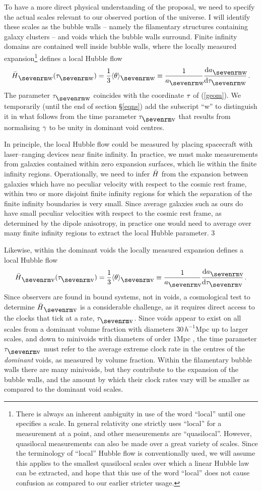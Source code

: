 \documentclass[12pt]{article}
\begin{document}
To have a more direct physical understanding of the proposal, we need to
specify the actual scales relevant to our observed portion of the universe.
I will identify these scales as the bubble walls -- namely the filamentary
structures containing galaxy clusters -- and voids which the bubble
walls surround. Finite infinity domains are contained well inside bubble
walls, where the locally measured expansion\footnote{There is always
an inherent ambiguity in use of the word ``local'' until one specifies a
scale. In general relativity one strictly uses ``local'' for a measurement
at a point, and other measurements are ``quasilocal''. However, quasilocal
measurements can also be made over a great variety of scales. Since
the terminology of ``local'' Hubble flow is conventionally used, we will
assume this applies to the smallest quasilocal scales over which a linear
Hubble law can be extracted, and hope that this use of the word ``local''
does not cause confusion as compared to our earlier stricter usage.}
defines a local Hubble flow
$$
\bH\ns{w}(\tw)=\frac13\ave\th\ns{w}\equiv{1\over\aw}\Deriv\dd\tw\aw\,.
$$
The parameter $\tw$ coincides with the coordinate $\tau$ of (\ref{geom}).
We temporarily (until the end of section \S\ref{eqns}) add the subscript
``w'' to distinguish it in what follows from the time parameter $\tv$ that
results from normalising $\gamma$ to be unity in dominant void centres.

In principle, the local Hubble flow could be measured by placing spacecraft
with laser--ranging devices near finite infinity. In practice, we must make
measurements from galaxies contained within zero expansion surfaces, which lie
within the finite infinity regions. Operationally, we need to infer $\bH$ from
the expansion between galaxies which have no peculiar velocity with respect to
the cosmic rest frame, within two or more disjoint finite infinity
regions for which the separation of the finite infinity boundaries is very
small. Since average galaxies such as ours do have small peculiar
velocities with respect to the cosmic rest frame, as determined by the
dipole anisotropy, in practice one would need to average over many finite
infinity regions to extract the local Hubble parameter.
\setcounter{footnote}3

Likewise, within the dominant voids the locally measured expansion defines a
local Hubble flow
$$
\bH\ns{v}(\tv)=\frac13\ave\th\ns{v}\equiv{1\over\av}\Deriv\dd\tv\av\,.
$$
Since observers are found in bound systems, not in voids, a cosmological
test to determine $\bH\ns{v}$ is a considerable challenge, as it requires
direct access to the clocks that tick at a rate, $\tv$. Since
voids appear to exist on all scales from a dominant volume fraction with
diameters $30\,h^{-1}$Mpc up to larger scales, and down to minivoids with
diameters of order $1$Mpc \cite{minivoids}, the time parameter $\tv$ must refer
to the average extreme clock rate in the centres of the {\em dominant} voids,
as measured by volume fraction. Within the filamentary bubble walls there
are many minivoids, but they contribute to the expansion of the bubble
walls, and the amount by which their clock rates vary will be smaller
as compared to the dominant void scales.
\end{document}
